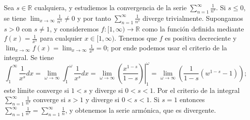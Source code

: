 \begin{example}\label{Ejemplo_pseries}
  Sea $s\in\mathbb{R}$ cualquiera, y estudiemos la convergencia de la serie $\sum_{n=1}^\infty \frac{1}{n^s}$. Si $s\leq 0$, se tiene $\lim_{x\to\infty}\frac{1}{n^s}\neq 0$ y por tanto $\sum_{n=1}^\infty \frac{1}{n^s}$ diverge trivialmente. Supongamos $s>0$ con $s\neq 1$, y consideremos $f:[1,\infty)\to\mathbb{R}$ como la función definida mediante $f(x)=\frac{1}{x^s}$ para cualquier $x\in[1,\infty)$. Tenemos que $f$ es positiva decreciente y $\lim_{x\to\infty}f(x)=\lim_{x\to\infty}\frac{1}{x^s}=0$; por ende podemos usar el criterio de la integral. Se tiene
  \begin{equation*}
    \int_1^\infty\frac{1}{x^s}dx=\lim_{\omega\to\infty}\int_1^\omega\frac{1}{x^s}dx=\lim_{\omega\to\infty}\left.\left(\frac{x^{1-s}}{1-s}\right)\right|_1^\omega=\lim_{\omega\to\infty}\left(\frac{1}{1-s}(w^{1-s}-1)\right);
  \end{equation*}
  este límite converge si $1<s$ y diverge si $0<s<1$. Por el criterio de la integral $\sum_{n=1}^\infty \frac{1}{n^s}$ converge si $s>1$ y diverge si $0<s<1$. Si $s=1$ entonces $\sum_{n=1}^\infty \frac{1}{n^s}=\sum_{n=1}^\infty \frac{1}{n}$, y obtenemos la serie armónica, que es divergente.
\end{example}

